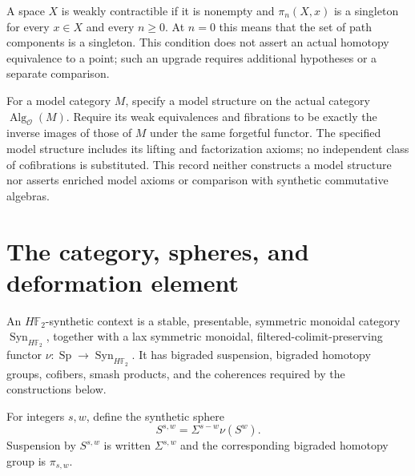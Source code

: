 \begin{definition}
  \label{def:weak-contractible-space}
  \leanok
  A space $X$ is weakly contractible if it is nonempty and
  $\pi_n(X,x)$ is a singleton for every $x\in X$ and every $n\geq0$.
  At $n=0$ this means that the set of path components is a singleton.
  This condition does not assert an actual homotopy equivalence to a point;
  such an upgrade requires additional hypotheses or a separate comparison.
\end{definition}

\begin{definition}
  \label{def:transferred-operadic-model}
  For a model category $M$, specify a model structure on the actual
  category $\operatorname{Alg}_{\mathcal O}(M)$. Require its weak
  equivalences and fibrations to be exactly the inverse images of those
  of $M$ under the same forgetful functor. The specified model structure
  includes its lifting and factorization axioms; no independent class of
  cofibrations is substituted. This record neither constructs a model
  structure nor asserts enriched model axioms or comparison with synthetic
  commutative algebras.
\end{definition}

\section{The category, spheres, and deformation element}

\begin{definition}
  \label{def:synthetic-context}
  \notready
  An $H\mathbb F_2$-synthetic context is a stable, presentable, symmetric
  monoidal category $\operatorname{Syn}_{H\mathbb F_2}$, together with a lax
  symmetric monoidal, filtered-colimit-preserving functor
  $\nu:\operatorname{Sp}\to\operatorname{Syn}_{H\mathbb F_2}$.  It has
  bigraded suspension, bigraded homotopy groups, cofibers, smash products, and
  the coherences required by the constructions below.
\end{definition}

\begin{definition}
  \label{def:synthetic-sphere}
  \notready
  For integers $s,w$, define the synthetic sphere
  \[
    S^{s,w}=\Sigma^{s-w}\nu(S^w).
  \]
  Suspension by $S^{s,w}$ is written $\Sigma^{s,w}$ and the corresponding
  bigraded homotopy group is $\pi_{s,w}$.
\end{definition}

